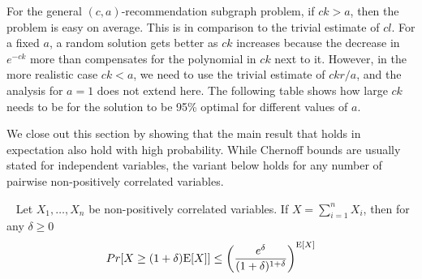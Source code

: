 
For the general $(c, a)$-recommendation subgraph problem, if $ck>a$, then the problem is easy on average. This
is in comparison to the trivial estimate of $cl$. For a fixed $a$, a
random solution gets better as $ck$ increases because the decrease in
$e^{-ck}$ more than compensates for the polynomial in $ck$ next to
it. However, in the more realistic case $ck<a$, we need to use the
trivial estimate of $ckr/a$, and the analysis for $a=1$ does not extend here. 
The following table shows how large 
$ck$ needs to be for the solution to be 95\% optimal for different
values of $a$.\vs




We close out this section by showing that the main result that holds in expectation also hold with high probability. 
While Chernoff bounds are usually stated for independent variables, the
variant below holds for any number of pairwise non-positively correlated
variables.

\begin{thm}\label{negative_corr_chernoff}~\cite{AugerDoerr2011}
Let $X_1,\ldots, X_n$ be non-positively correlated variables. If $X=\sum_{i=1}^n X_i$, then for any $\delta\geq 0$
\[ Pr[X \geq (1+\delta)\text{E}[X] ] \leq \left(\frac{e^\delta}{(1+\delta)^{1+\delta}}\right)^{\text{E}[X]} \]
\end{thm}

